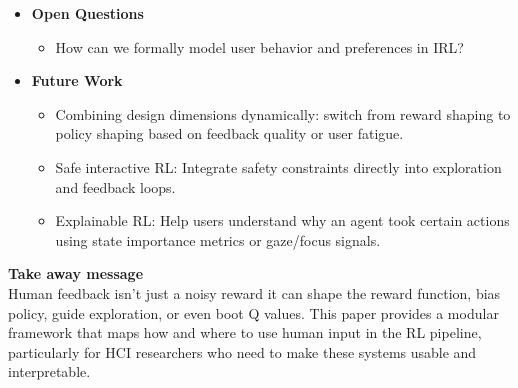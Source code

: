 \documentclass[report.tex]{subfiles}
\begin{document}
\begin{itemize}
    \item \noindent\textbf {Open Questions}
    \begin{itemize}
        \item     How can we formally model user behavior and preferences in IRL?


    \end{itemize}
    
    \item \noindent\textbf{Future Work}
    \begin{itemize}
        \item Combining design	 dimensions dynamically: switch from reward shaping to policy shaping based on feedback quality or user fatigue.
        \item Safe interactive RL: Integrate safety constraints directly into exploration and feedback loops.
        \item Explainable RL: Help users understand why an agent took certain actions using state importance metrics or gaze/focus signals.
        
    \end{itemize}
\end{itemize}


\noindent\textbf{Take away message}  \\
Human feedback isn’t just a noisy reward it can shape the reward function, bias policy, guide exploration, or even boot Q values. This paper provides a modular framework that maps how and where to use human input in the RL pipeline, particularly for HCI researchers who need to make these systems usable and interpretable.
\end{document}
